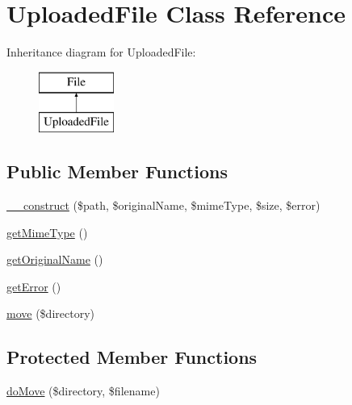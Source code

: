 \hypertarget{class_symfony_1_1_component_1_1_http_foundation_1_1_file_1_1_uploaded_file}{
\section{\-Uploaded\-File \-Class \-Reference}
\label{class_symfony_1_1_component_1_1_http_foundation_1_1_file_1_1_uploaded_file}
}
\-Inheritance diagram for \-Uploaded\-File\-:\begin{figure}[H]
\begin{center}
\leavevmode
\includegraphics[height=2.000000cm]{class_symfony_1_1_component_1_1_http_foundation_1_1_file_1_1_uploaded_file}
\end{center}
\end{figure}
\subsection*{\-Public \-Member \-Functions}
\begin{DoxyCompactItemize}
\item 
\hyperlink{class_symfony_1_1_component_1_1_http_foundation_1_1_file_1_1_uploaded_file_af4792981dd2724a67eaf7a1213c404e8}{\-\_\-\-\_\-construct} (\$path, \$original\-Name, \$mime\-Type, \$size, \$error)
\item 
\hyperlink{class_symfony_1_1_component_1_1_http_foundation_1_1_file_1_1_uploaded_file_ac06e9f7b10fca30eb41e41d4dc108b1c}{get\-Mime\-Type} ()
\item 
\hyperlink{class_symfony_1_1_component_1_1_http_foundation_1_1_file_1_1_uploaded_file_a45128bd7cae9bc9b315447474a63ed19}{get\-Original\-Name} ()
\item 
\hyperlink{class_symfony_1_1_component_1_1_http_foundation_1_1_file_1_1_uploaded_file_a24ada5decce3d1b79cd82f5a90ccf404}{get\-Error} ()
\item 
\hyperlink{class_symfony_1_1_component_1_1_http_foundation_1_1_file_1_1_uploaded_file_a2430eaa80b28941a8be89db71eea9261}{move} (\$directory)
\end{DoxyCompactItemize}
\subsection*{\-Protected \-Member \-Functions}
\begin{DoxyCompactItemize}
\item 
\hyperlink{class_symfony_1_1_component_1_1_http_foundation_1_1_file_1_1_uploaded_file_ad552ce07f8efd83237ad1ad0a28e98ce}{do\-Move} (\$directory, \$filename)
\end{DoxyCompactItemize}
